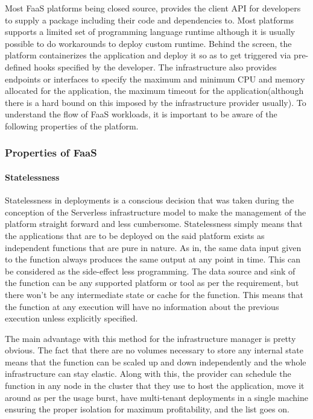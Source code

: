 \documentclass[12pt,titlepage]{article}
\begin{document}
Most FaaS platforms being closed source, provides the client API for developers
to supply a package including their code and dependencies to. Most platforms
supports a limited set of programming language runtime although it is usually
possible to do workarounds to deploy custom runtime. Behind the screen,
the platform containerizes the application and deploy it so as to get triggered
via pre-defined hooks specified by the developer. The infrastructure also provides endpoints or
interfaces to specify the maximum and minimum CPU and memory allocated for the
application, the maximum timeout for the application(although there is a
hard bound on this imposed by the infrastructure provider usually). To
understand the flow of FaaS workloads, it is important to be aware of the
following properties of the platform.

\subsubsection{Properties of FaaS}
\label{sec:org55ffa6e}
\paragraph{Statelessness}
\label{sec:org57668f1}
Statelessness in deployments is a conscious decision that was taken during the
conception of the Serverless infrastructure model to make the management of the
platform straight forward and less cumbersome. Statelessness simply means that
the applications that are to be deployed on the said platform exists as
independent functions that are pure in nature. As in, the same data input given
to the function always produces the same output at any point in time. This can
be considered as the side-effect less programming. The data source and sink of
the function can be any supported platform or tool as per the requirement, but
there won't be any intermediate state or cache for the function. This means that
the function at any execution will have no information about the previous
execution unless explicitly specified.

The main advantage with this method for the infrastructure manager is pretty
obvious. The fact that there are no volumes necessary to store any internal
state means that the function can be scaled up and down independently and the
whole infrastructure can stay elastic. Along with this, the provider can
schedule the function in any node in the cluster that they use to host the
application, move it around as per the usage burst, have multi-tenant
deployments in a single machine ensuring the proper isolation for maximum
profitability, and the list goes on.
\end{document}
